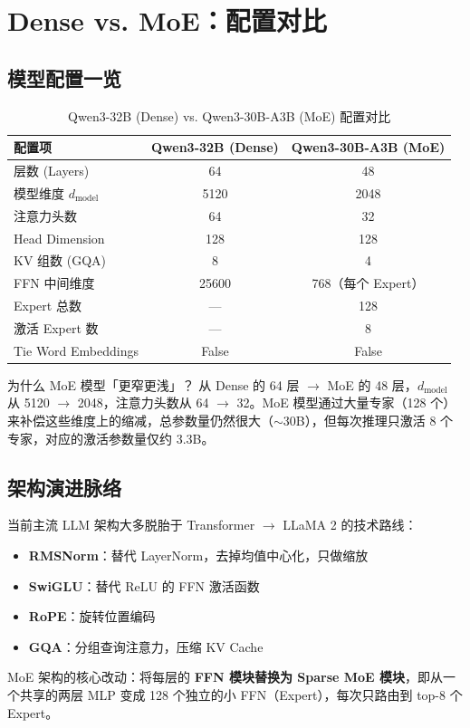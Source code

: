 \section{Dense vs. MoE：配置对比}

\subsection{模型配置一览}

\begin{table}[H]
\centering
\caption{Qwen3-32B (Dense) vs. Qwen3-30B-A3B (MoE) 配置对比}
\begin{tabular}{lcc}
\toprule
\textbf{配置项} & \textbf{Qwen3-32B (Dense)} & \textbf{Qwen3-30B-A3B (MoE)} \\
\midrule
层数 (Layers) & 64 & 48 \\
模型维度 $d_{\text{model}}$ & 5120 & 2048 \\
注意力头数 & 64 & 32 \\
Head Dimension & 128 & 128 \\
KV 组数 (GQA) & 8 & 4 \\
FFN 中间维度 & 25600 & 768（每个 Expert） \\
Expert 总数 & — & 128 \\
激活 Expert 数 & — & 8 \\
Tie Word Embeddings & False & False \\
\bottomrule
\end{tabular}
\end{table}

\begin{knowledgebox}{为什么 MoE 模型「更窄更浅」？}
从 Dense 的 64 层 $\to$ MoE 的 48 层，$d_{\text{model}}$ 从 5120 $\to$ 2048，注意力头数从 64 $\to$ 32。MoE 模型通过大量专家（128 个）来补偿这些维度上的缩减，总参数量仍然很大（$\sim$30B），但每次推理只激活 8 个专家，对应的激活参数量仅约 3.3B。
\end{knowledgebox}

\subsection{架构演进脉络}

当前主流 LLM 架构大多脱胎于 Transformer $\to$ LLaMA 2 的技术路线：

\begin{itemize}
  \item \textbf{RMSNorm}：替代 LayerNorm，去掉均值中心化，只做缩放
  \item \textbf{SwiGLU}：替代 ReLU 的 FFN 激活函数
  \item \textbf{RoPE}：旋转位置编码
  \item \textbf{GQA}：分组查询注意力，压缩 KV Cache
\end{itemize}

MoE 架构的核心改动：将每层的 \textbf{FFN 模块替换为 Sparse MoE 模块}，即从一个共享的两层 MLP 变成 128 个独立的小 FFN（Expert），每次只路由到 top-8 个 Expert。


